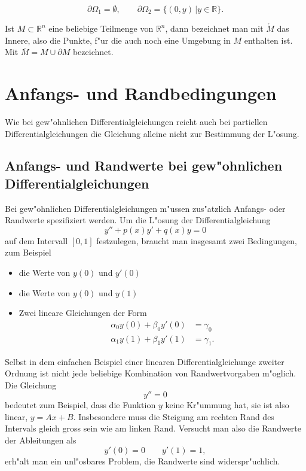 \begin{beispiel}
\[
\partial \Omega_1=\emptyset,\qquad\partial \Omega_2=\{(0,y)\,|y\in\mathbb R\}.
\]
\end{beispiel}

\begin{definition}
Ist $M\subset\mathbb R^n$ eine beliebige Teilmenge von $\mathbb R^n$,
dann bezeichnet man mit $\mathring M$ das Innere, also die Punkte,
f"ur die auch noch eine Umgebung in $M$ enthalten ist. Mit
$\bar M=M\cup\partial M$ bezeichnet.
\end{definition}

\section{Anfangs- und Randbedingungen\label{klassifikation:randbedingungen}}
Wie bei gew"ohnlichen Differentialgleichungen reicht auch bei
partiellen Differentialgleichungen die Gleichung alleine nicht
zur Bestimmung der L"osung.
\subsection{Anfangs- und Randwerte bei gew"ohnlichen Differentialgleichungen\label{klassifkation:anfangswerte-ode}}
Bei gew"ohnlichen Differentialgleichungen
m"ussen zus"atzlich Anfangs- oder Randwerte spezifiziert werden.
Um die L"osung der Differentialgleichung
\[
y''+p(x)y'+q(x)y=0
\]
auf dem Intervall $[0,1]$
festzulegen, braucht man insgesamt zwei Bedingungen, zum Beispiel
\begin{itemize}
\item die Werte von $y(0)$ und $y'(0)$
\item die Werte von $y(0)$ und $y(1)$
\item Zwei lineare Gleichungen der Form
\begin{align*}
\alpha_0y(0)+\beta_0y'(0)&=\gamma_0\\
\alpha_1y(1)+\beta_1y'(1)&=\gamma_1.
\end{align*}
\end{itemize}

\begin{beispiel}
Selbst in dem einfachen Beispiel einer linearen Differentialgleichunge
zweiter Ordnung ist nicht jede beliebige Kombination von Randwertvorgaben
m"oglich. Die Gleichung
\[
y''=0
\]
bedeutet zum Beispiel, dass die Funktion $y$ keine Kr"ummung hat, sie
ist also linear, $y=Ax+B$. Insbesondere muss die Steigung am rechten
Rand des Intervals gleich gross sein wie am linken Rand. Versucht man
also die Randwerte der Ableitungen als
\[
y'(0)=0\qquad y'(1)=1,
\]
erh"alt man ein unl"osbares Problem, die Randwerte sind widerspr"uchlich.
\end{beispiel}

